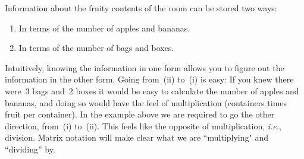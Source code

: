 %
\noindent
Information about the fruity contents of the room can be stored two ways: 
\begin{enumerate}\renewcommand{\theenumi}{(\roman*{enumi})}
\item In terms of the number of apples and bananas. 
\item In terms of the number of bags and boxes. 
\end{enumerate}
Intuitively, knowing the information in one form allows you to figure out the information in the other form. 
Going from~(ii) to~(i) is easy: 
If you knew there were~3 bags and~2 boxes it would be easy to calculate the number of apples and bananas, and doing so would have the feel of multiplication (containers times fruit per container). 
In the example above we are required to go the other direction, from~(i) to~(ii). This  feels like the opposite of multiplication, {\itshape i.e.}, division. Matrix notation will 
make clear what we are ``multiplying" and ``dividing'' by. 

